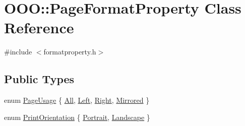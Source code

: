 \hypertarget{classOOO_1_1PageFormatProperty}{\section{O\+O\+O\+:\+:Page\+Format\+Property Class Reference}
\label{classOOO_1_1PageFormatProperty}
}


{\ttfamily \#include $<$formatproperty.\+h$>$}

\subsection*{Public Types}
\begin{DoxyCompactItemize}
\item 
enum \hyperlink{classOOO_1_1PageFormatProperty_a3b4f1d357a8990fd17570f1154fb435f}{Page\+Usage} \{ \hyperlink{classOOO_1_1PageFormatProperty_a3b4f1d357a8990fd17570f1154fb435fa2063d9d20d58c52777b321f432a133e2}{All}, 
\hyperlink{classOOO_1_1PageFormatProperty_a3b4f1d357a8990fd17570f1154fb435fa0b514c217521fd1c32481c8a7fb14e1e}{Left}, 
\hyperlink{classOOO_1_1PageFormatProperty_a3b4f1d357a8990fd17570f1154fb435fa178bbe31bea8da3ed73f19237a421dc9}{Right}, 
\hyperlink{classOOO_1_1PageFormatProperty_a3b4f1d357a8990fd17570f1154fb435fabe42564a328487ede9193fbe27908532}{Mirrored}
 \}
\item 
enum \hyperlink{classOOO_1_1PageFormatProperty_a89cc887141e802d6cfe6320c318a2a47}{Print\+Orientation} \{ \hyperlink{classOOO_1_1PageFormatProperty_a89cc887141e802d6cfe6320c318a2a47a05cfe865bed89b837f2cd3b57e5ec4ea}{Portrait}, 
\hyperlink{classOOO_1_1PageFormatProperty_a89cc887141e802d6cfe6320c318a2a47a15c78e9d960a7a477c574922e2a96ca4}{Landscape}
 \}
\end{DoxyCompactItemize}
